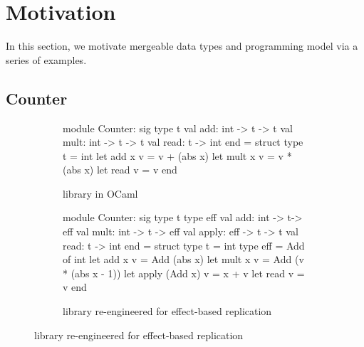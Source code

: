 \section{Motivation}

In this section, we motivate mergeable data types and \name
programming model via a series of examples. 

\subsection{Counter}

\begin{figure}

\begin{subfigure}[b]{0.4\textwidth}
  \begin{ocaml}
    module Counter: sig
      type t
      val add: int -> t -> t
      val mult: int -> t -> t
      val read: t -> int
    end = struct
      type t = int
      let add x v = v + (abs x)
      let mult x v = v * (abs x)
      let read v = v
    end
  \end{ocaml}

\caption{ library in OCaml}
\label{fig:counter-adt}
\end{subfigure}
\begin{subfigure}[b]{0.56\textwidth}
  \begin{ocaml}
    module Counter: sig
      type t
      type eff 
      val add: int -> t-> eff
      val mult: int -> t -> eff
      val apply: eff -> t -> t
      val read: t -> int
    end = struct
      type t = int
      type eff = Add of int
      let add x v = Add (abs x)
      let mult x v = Add (v * (abs x - 1))
      let apply (Add x) v = x + v
      let read v = v
    end
  \end{ocaml}

\caption{ library re-engineered for effect-based replication}
\label{fig:counter-rdt}
\end{subfigure}


\end{figure}

